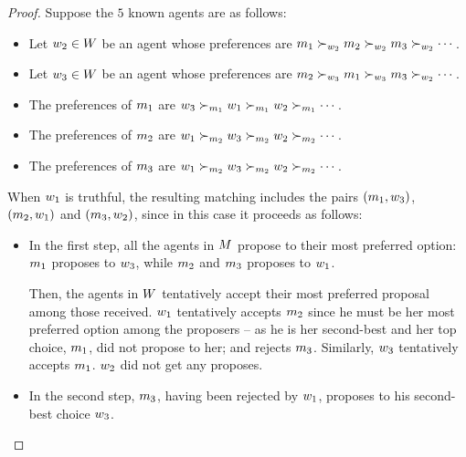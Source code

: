 \begin{lemmarep}
\label{lem:da-switch}
\end{lemmarep}

\begin{proof}
Suppose the $5$ known agents are as follows:
\begin{itemize}
\item Let $w_2 \in W$ be an agent whose preferences are $m_1 \succ_{w_2} m_2 \succ_{w_2} m_3 \succ_{w_2} \cdots $.

\item Let $w_3 \in W$ be an agent whose preferences are $m_2 \succ_{w_3} m_1 \succ_{w_3} m_3 \succ_{w_2} \cdots $.

\item The preferences of $m_1$ are $w_3 \succ_{m_1} w_1 \succ_{m_1} w_2 \succ_{m_1} \cdots$.

\item The preferences of $m_2$ are $w_1 \succ_{m_2} w_3 \succ_{m_2} w_2 \succ_{m_2} \cdots$.

\item The preferences of $m_3$ are $w_1 \succ_{m_2} w_3 \succ_{m_2} w_2 \succ_{m_2} \cdots$.
\end{itemize}


When $w_1$ is truthful, the resulting matching includes the pairs $(m_1, w_3)$, $(m_2, w_1)$ and $(m_3, w_2)$, since in this case it proceeds as follows:
\begin{itemize}
\item In the first step, all the agents in $M$ propose to their most preferred option: $m_1$ proposes to $w_3$, while $m_2$ and $m_3$ proposes to $w_1$.

Then, the agents in $W$ tentatively accept their most preferred proposal among those received.
$w_1$ tentatively accepts $m_2$ since he must be her most preferred option among the proposers -- as he is her second-best and her top choice, $m_1$, did not propose to her; and rejects $m_3$.
Similarly, $w_3$ tentatively accepts $m_1$.
$w_2$ did not get any proposes.  

\item In the second step, $m_3$, having been rejected by $w_1$, proposes to his second-best choice $w_3$.


\end{itemize}
\end{proof}
